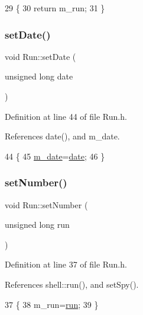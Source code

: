 \begin{DoxyCode}
29                         \{
30     \textcolor{keywordflow}{return} m\_run;
31   \}
\end{DoxyCode}
\mbox{\label{classRun_ad6c534e3fdce5978250ca04791934680}} 
\subsubsection{\texorpdfstring{set\+Date()}{setDate()}}
{\footnotesize\ttfamily void Run\+::set\+Date (\begin{DoxyParamCaption}\item[{unsigned long}]{date }\end{DoxyParamCaption})\hspace{0.3cm}{\ttfamily [inline]}}



Definition at line 44 of file Run.\+h.



References date(), and m\+\_\+date.


\begin{DoxyCode}
44                                   \{
45     \hyperlink{classRun_a841000f96566fdbe5772f16ef3963006}{m\_date}=\hyperlink{classRun_ae5f87d35674ded8f7a0d0ca3d842a7b4}{date};
46   \}  
\end{DoxyCode}
\mbox{\label{classRun_a0ad734e3ee75d2b58631e5b237a55f5d}} 
\subsubsection{\texorpdfstring{set\+Number()}{setNumber()}}
{\footnotesize\ttfamily void Run\+::set\+Number (\begin{DoxyParamCaption}\item[{unsigned long}]{run }\end{DoxyParamCaption})\hspace{0.3cm}{\ttfamily [inline]}}



Definition at line 37 of file Run.\+h.



References shell\+::run(), and set\+Spy().


\begin{DoxyCode}
37                                    \{
38     m\_run=\hyperlink{namespaceshell_ac89ea08a5e75ecb222fe9e707b3ee102}{run};
39   \}
\end{DoxyCode}
\mbox{\label{classRun_a391d15d3d908d3d011214dba1a075277}} 
